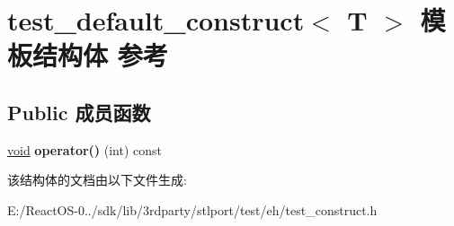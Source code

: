 \hypertarget{structtest__default__construct}{}\section{test\+\_\+default\+\_\+construct$<$ T $>$ 模板结构体 参考}
\label{structtest__default__construct}
\subsection*{Public 成员函数}
\begin{DoxyCompactItemize}
\item 
\mbox{\label{structtest__default__construct_af5e9f2d871a09fb2572a6c38eca4cf9c}} 
\hyperlink{interfacevoid}{void} {\bfseries operator()} (int) const
\end{DoxyCompactItemize}


该结构体的文档由以下文件生成\+:\begin{DoxyCompactItemize}
\item 
E\+:/\+React\+O\+S-\/0../sdk/lib/3rdparty/stlport/test/eh/test\+\_\+construct.\+h\end{DoxyCompactItemize}
